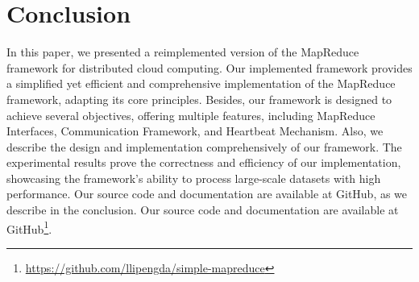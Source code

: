 \section{Conclusion}
\label{sec:conclusion}
In this paper, we presented a reimplemented version of the MapReduce framework for distributed cloud computing. Our implemented framework provides a simplified yet efficient and comprehensive implementation of the MapReduce framework, adapting its core principles. Besides, our framework is designed to achieve several objectives, offering multiple features, including MapReduce Interfaces, Communication Framework, and Heartbeat Mechanism. Also, we describe the design and implementation comprehensively of our framework. The experimental results prove the correctness and efficiency of our implementation, showcasing the framework's ability to process large-scale datasets with high performance. Our source code and documentation are available at GitHub, as we describe in the conclusion. Our source code and documentation are available at GitHub\footnote{\url{https://github.com/llipengda/simple-mapreduce}}.